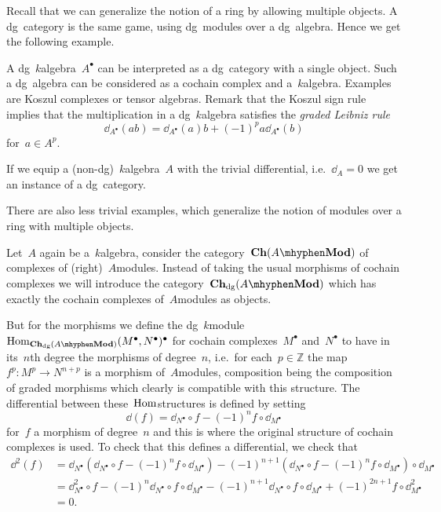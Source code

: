 Recall that we can generalize the notion of a ring by allowing multiple objects. A dg~category is the same game, using dg~modules over a dg~algebra. Hence we get the following example.
\begin{example}
  \label{example:dg-category-of-algebra}
  A dg~$k$\dash algebra~$A^\bullet$ can be interpreted as a dg~category with a single object. Such a dg~algebra can be considered as a cochain complex and a~$k$\dash algebra. Examples are Koszul complexes or tensor algebras. Remark that the Koszul sign rule implies that the multiplication in a dg~$k$\dash algebra satisfies the \emph{graded Leibniz rule}
  \begin{equation}
    \dd_{A^\bullet}(ab)=\dd_{A^\bullet}(a)b+(-1)^pa\dd_{A^\bullet}(b)
  \end{equation}
  for~$a\in A^p$.
  
  If we equip a (non-dg)~$k$\dash algebra~$A$ with the trivial differential, i.e.\ $\dd_A=0$ we get an instance of a dg~category.
\end{example}
There are also less trivial examples, which generalize the notion of modules over a ring with multiple objects.
\begin{example}
  \label{example:Ch-dg(A-mod)}
  Let~$A$ again be a~$k$\dash algebra, consider the category~$\Ch(A\mhyphen\Mod)$ of complexes of (right)~$A$\dash modules. Instead of taking the usual morphisms of cochain complexes we will introduce the category~$\Ch_\dg(A\mhyphen\Mod)$ which has exactly the cochain complexes of~$A$\dash modules as objects.
  
  But for the morphisms we define the dg~$k$\dash module~$\Hom_{\Ch_\dg(A\mhyphen\Mod)}(M^\bullet,N^\bullet)^\bullet$ for cochain complexes~$M^\bullet$ and~$N^\bullet$ to have in its~$n$th degree the morphisms of degree~$n$, i.e.~for each~$p\in\mathbb{Z}$ the map~$f^p\colon M^p\to N^{n+p}$ is a morphism of~$A$\dash modules, composition being the composition of graded morphisms which clearly is compatible with this structure. The differential between these~$\mathrm{Hom}$\dash structures is defined by setting
  \begin{equation}
    \dd(f)=\dd_{N^\bullet}\circ f-(-1)^nf\circ\dd_{M^\bullet}
  \end{equation}
  for~$f$ a morphism of degree~$n$ and this is where the original structure of cochain complexes is used. To check that this defines a differential, we check that
  \begin{equation}
    \begin{aligned}
      \dd^2(f)&=\dd_{N^\bullet}\left( \dd_{N^\bullet}\circ f-(-1)^nf\circ\dd_{M^\bullet} \right)-(-1)^{n+1}\left( \dd_{N^\bullet}\circ f-(-1)^nf\circ\dd_{M^\bullet} \right)\circ\dd_{M^\bullet} \\
      &=\dd_{N^\bullet}^2\circ f-(-1)^n\dd_{N^\bullet}\circ f\circ\dd_{M^\bullet}-(-1)^{n+1}\dd_{N^\bullet}\circ f\circ\dd_{M^\bullet}+(-1)^{2n+1}f\circ\dd_{M^\bullet}^2 \\
      &=0.
    \end{aligned}
  \end{equation}
\end{example}

